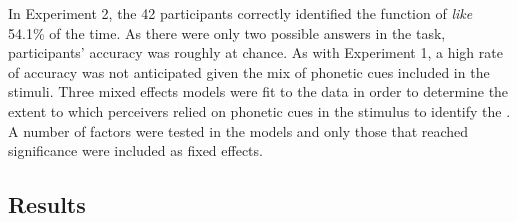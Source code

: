 \begin{table}[ht]
\begin{center}
\caption{Potential phonetic cues in stimuli from Experiment 2, by type and social group}\label{tab:cues2}
\end{center}
\end{table} 

In Experiment 2, the 42 participants correctly identified the function of \textit{like} 54.1\% of the time. As there were only two possible answers in the task, participants' accuracy was roughly at chance. As with Experiment 1, a high rate of accuracy was not anticipated given the mix of phonetic cues included in the stimuli. Three mixed effects models were fit to the data in order to determine the extent to which perceivers relied on phonetic cues in the stimulus to identify the . A number of factors were tested in the models and only those that reached significance were included as fixed effects.

\subsection{Results}

